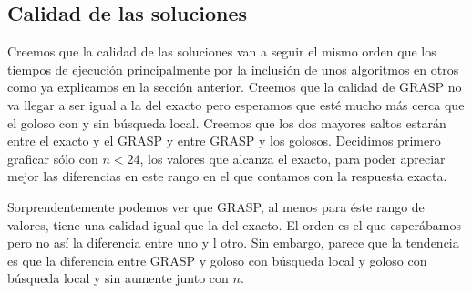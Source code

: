 \subsection{Calidad de las soluciones}
Creemos que la calidad de las soluciones van a seguir el mismo orden que los tiempos de ejecución
principalmente por la inclusión de unos algoritmos en otros como ya explicamos en la sección anterior.
Creemos que la calidad de GRASP no va llegar a ser igual a la del exacto pero esperamos
que esté mucho más cerca que el goloso con y sin búsqueda local. Creemos que los dos mayores saltos
estarán entre el exacto y el GRASP y entre GRASP y los golosos.
Decidimos primero graficar sólo con $n < 24$, los valores que alcanza el exacto, para poder apreciar
mejor las diferencias en este rango en el que contamos con la respuesta exacta.
\begin{figure}[H]
    \begin{minipage}[t]{\linewidth}
		\centering
		\label{fig:ejercicio-6-comparacion-calidad}
    \end{minipage}
\end{figure}

Sorprendentemente podemos ver que GRASP, al menos para éste rango de valores, tiene una calidad
igual que la del exacto. El orden es el que esperábamos pero no así la diferencia entre uno y l otro.
Sin embargo, parece que la tendencia es que la diferencia entre GRASP y goloso con búsqueda local y
goloso con búsqueda local y sin aumente junto con $n$.

